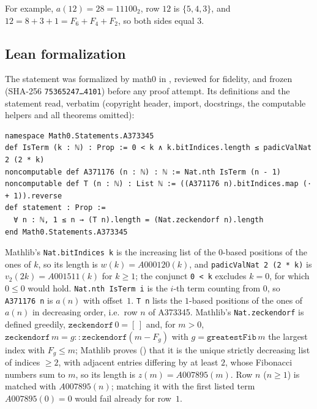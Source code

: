 \documentclass[11pt]{amsart}
\theoremstyle{plain}
\theoremstyle{definition}
\begin{document}
For example, $a(12)=28=11100_2$, row $12$ is $\{5,4,3\}$, and $12=8+3+1=F_6+F_4+F_2$, so both sides equal $3$.

\subsection*{Lean formalization}
The statement was formalized by math0 in , reviewed for fidelity, and frozen (SHA-256 \texttt{75365247\ldots 4101}) before any proof attempt. Its definitions and the statement read, verbatim (copyright header, import, docstrings, the computable helpers and all theorems omitted):
\begin{lstlisting}
namespace Math0.Statements.A373345
def IsTerm (k : ℕ) : Prop := 0 < k ∧ k.bitIndices.length ≤ padicValNat 2 (2 * k)
noncomputable def A371176 (n : ℕ) : ℕ := Nat.nth IsTerm (n - 1)
noncomputable def T (n : ℕ) : List ℕ := ((A371176 n).bitIndices.map (· + 1)).reverse
def statement : Prop :=
  ∀ n : ℕ, 1 ≤ n → (T n).length = (Nat.zeckendorf n).length
end Math0.Statements.A373345
\end{lstlisting}
Mathlib's \texttt{Nat.bitIndices k} is the increasing list of the $0$-based positions of the ones of $k$, so its length is $w(k)=A000120(k)$, and \texttt{padicValNat 2 (2 * k)} is $v_2(2k)=A001511(k)$ for $k\ge1$; the conjunct \texttt{0 < k} excludes $k=0$, for which $0\le0$ would hold. \texttt{Nat.nth IsTerm i} is the $i$-th term counting from $0$, so \texttt{A371176 n} is $a(n)$ with offset~$1$. \texttt{T n} lists the $1$-based positions of the ones of $a(n)$ in decreasing order, i.e.\ row $n$ of A373345.
Mathlib's \texttt{Nat.zeckendorf} is defined greedily, $\mathtt{zeckendorf}\,0=[\,]$ and, for $m>0$, $\mathtt{zeckendorf}\,m=g::\mathtt{zeckendorf}(m-F_g)$ with $g=\mathtt{greatestFib}\,m$ the largest index with $F_g\le m$; Mathlib proves () that it is the unique strictly decreasing list of indices $\ge2$, with adjacent entries differing by at least $2$, whose Fibonacci numbers sum to $m$, so its length is $z(m)=A007895(m)$. Row $n$ ($n\ge1$) is matched with $A007895(n)$; matching it with the first listed term $A007895(0)=0$ would fail already for row~$1$.
\end{document}
